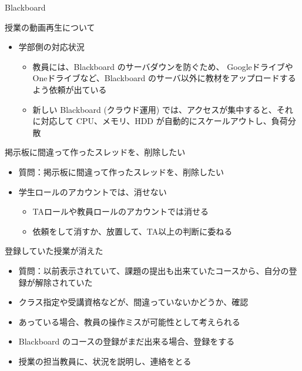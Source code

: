 \documentclass[a4j,10pt]{jsarticle}
\begin{document}
{\begin{frame}[label={sec:org166405d},fragile]{Blackboard}
\begin{block}{授業の動画再生について}
\begin{itemize}
\begin{itemize}
\item 混み合っている時間帯では、ファイルのダウンロードに失敗したり、ダウンロードしてもファイルが破損していたりする
\item なお、教材のダウンロードを教員が許可しない設定の場合、「マウス右クリック」による保存はできない
\end{itemize}
\par
\item 学部側の対応状況
\begin{itemize}
\item 教員には、Blackboard のサーバダウンを防ぐため、 Googleドライブや Oneドライブなど、Blackboard のサーバ以外に教材をアップロードするよう依頼が出ている
\item 新しい Blackboard (クラウド運用) では、アクセスが集中すると、それに対応して CPU、メモリ、HDD が自動的にスケールアウトし、負荷分散
\end{itemize}
\end{itemize}
\end{block}
\par
\begin{block}{掲示板に間違って作ったスレッドを、削除したい}
\begin{itemize}
\item 質問：掲示板に間違って作ったスレッドを、削除したい
\par
\item 学生ロールのアカウントでは、消せない
\begin{itemize}
\item TAロールや教員ロールのアカウントでは消せる
\item 依頼をして消すか、放置して、TA以上の判断に委ねる
\end{itemize}
\end{itemize}
\end{block}
\par
\begin{block}{登録していた授業が消えた}
\begin{itemize}
\item 質問：以前表示されていて、課題の提出も出来ていたコースから、自分の登録が解除されていた
\par
\item クラス指定や受講資格などが、間違っていないかどうか、確認
\item あっている場合、教員の操作ミスが可能性として考えられる
\item Blackboard のコースの登録がまだ出来る場合、登録をする
\item 授業の担当教員に、状況を説明し、連絡をとる

\end{itemize}
\end{block}
\end{frame}}
\end{document}
